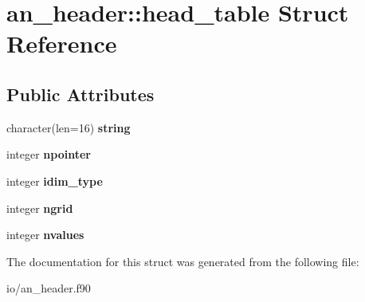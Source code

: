 \hypertarget{structan__header_1_1head__table}{
\section{an\_\-header::head\_\-table Struct Reference}
\label{structan__header_1_1head__table}
}
\subsection*{Public Attributes}
\begin{DoxyCompactItemize}
\item 
\hypertarget{structan__header_1_1head__table_a1be9d5f56131baf037a9da190f74189e}{
character(len=16) {\bfseries string}}
\label{structan__header_1_1head__table_a1be9d5f56131baf037a9da190f74189e}

\item 
\hypertarget{structan__header_1_1head__table_ad73cf9ac7e4131420e4303aa425b183f}{
integer {\bfseries npointer}}
\label{structan__header_1_1head__table_ad73cf9ac7e4131420e4303aa425b183f}

\item 
\hypertarget{structan__header_1_1head__table_a2c0e5e1896dce4260004d928663c8861}{
integer {\bfseries idim\_\-type}}
\label{structan__header_1_1head__table_a2c0e5e1896dce4260004d928663c8861}

\item 
\hypertarget{structan__header_1_1head__table_acc79dab7891f45424b13bf4f0f179585}{
integer {\bfseries ngrid}}
\label{structan__header_1_1head__table_acc79dab7891f45424b13bf4f0f179585}

\item 
\hypertarget{structan__header_1_1head__table_a75d0ca98f45425fdb8df177b5c2458e5}{
integer {\bfseries nvalues}}
\label{structan__header_1_1head__table_a75d0ca98f45425fdb8df177b5c2458e5}

\end{DoxyCompactItemize}


The documentation for this struct was generated from the following file:\begin{DoxyCompactItemize}
\item 
io/an\_\-header.f90\end{DoxyCompactItemize}
